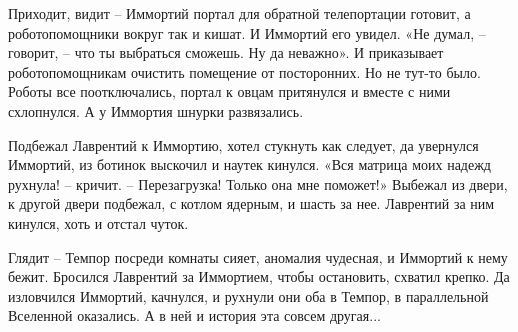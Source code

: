 \documentclass[ebook,oneside,final,openright]{memoir}
\begin{document}
\par
Приходит, видит – Иммортий портал для обратной телепортации готовит, а роботопомощники вокруг так и кишат. И Иммортий его увидел. «Не думал, – говорит, – что ты выбраться сможешь. Ну да неважно». И приказывает роботопомощникам очистить помещение от посторонних. Но не тут-то было. Роботы все поотключались, портал к овцам притянулся и вместе с ними схлопнулся. А у Иммортия шнурки развязались.\par
\par
Подбежал Лаврентий к Иммортию, хотел стукнуть как следует, да увернулся Иммортий, из ботинок выскочил и наутек кинулся. «Вся матрица моих надежд рухнула! – кричит. – Перезагрузка! Только она мне поможет!» Выбежал из двери, к другой двери подбежал, с котлом ядерным, и шасть за нее. Лаврентий за ним кинулся, хоть и отстал чуток.\par
\par
Глядит – Темпор посреди комнаты сияет, аномалия чудесная, и Иммортий к нему бежит. Бросился Лаврентий за Иммортием, чтобы остановить, схватил крепко. Да изловчился Иммортий, качнулся, и рухнули они оба в Темпор, в параллельной Вселенной оказались. А в ней и история эта совсем другая...\par
\end{document}
